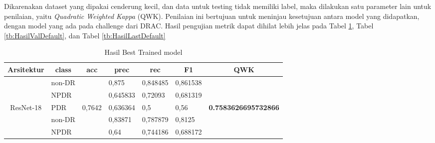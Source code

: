 Dikarenakan dataset yang dipakai cenderung kecil, dan data untuk testing tidak memiliki label, maka dilakukan satu parameter lain untuk penilaian, yaitu \emph{Quadratic Weighted Kappa} (QWK). Penilaian ini bertujuan untuk meninjau kesetujuan antara model yang didapatkan, dengan model yang ada pada challenge dari DRAC. Hasil pengujian metrik dapat dihilat lebih jelas pada Tabel \ref{tb:HasilTrainDefault}, Tabel \ref{tb:HasilValDefault}, dan Tabel \ref{tb:HasilLastDefault}

\pagebreak

\begin{table}[hbtp]
	\begin{center}
		\caption{Hasil Best Trained model}
		\label{tb:HasilTrainDefault}
		\begin{tabular}{|c|l|c|l|l|l|c|}
			\hline
			\rowcolor[HTML]{C0C0C0} 
			Arsitektur & \multicolumn{1}{c|}{\cellcolor[HTML]{C0C0C0}class} & acc                      & \multicolumn{1}{c|}{\cellcolor[HTML]{C0C0C0}prec} & \multicolumn{1}{c|}{\cellcolor[HTML]{C0C0C0}rec} & \multicolumn{1}{c|}{\cellcolor[HTML]{C0C0C0}F1} & QWK                                  \\ \hline
			& non-DR                                             &                          & 0,875                                             & 0,848485                                         & 0,861538                                        &                                      \\ \cline{2-2} \cline{4-6}
			& NPDR                                               &                          & 0,645833                                          & 0,72093                                          & 0,681319                                        &                                      \\ \cline{2-2} \cline{4-6}
			\multirow{-3}{*}{ResNet-18}  & PDR                                                & \multirow{-3}{*}{0,7642} & 0,636364                                          & 0,5                                              & 0,56                                            & \multirow{-3}{*}{\textbf{0.7583626695732866}} \\ \hline
			& non-DR                                             &                          & 0,83871                                           & 0,787879                                         & 0,8125                                          &                                      \\ \cline{2-2} \cline{4-6}
			& NPDR                                               &                          & 0,64                                              & 0,744186                                         & 0,688172                                        &                                      \\ \cline{2-2} \cline{4-6}

\end{tabular}
\end{center}
\end{table}
